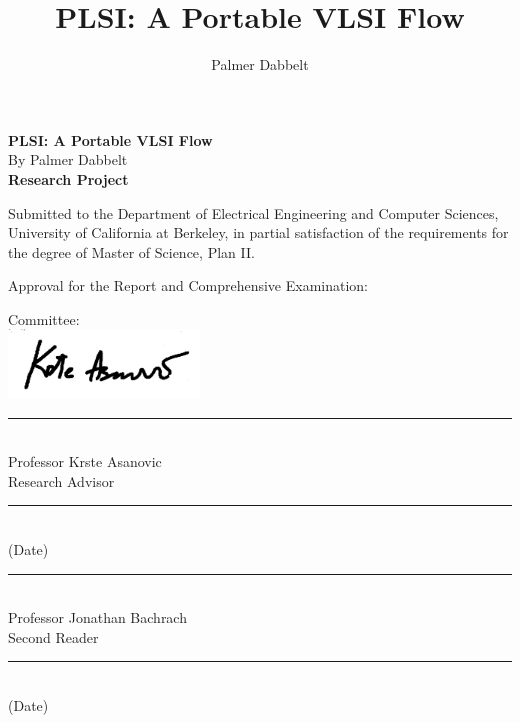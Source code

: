 \documentclass[masters2]{ucbthesis}
\author{Palmer Dabbelt}
\title{PLSI: A Portable VLSI Flow}
\begin{document}
\thispagestyle{empty}
\large
\begin{center}
\textbf{PLSI: A Portable VLSI Flow}\\
By Palmer Dabbelt\\
\textbf{Research Project}\\
\end{center}

\normalsize
Submitted to the Department of Electrical Engineering and Computer Sciences,
University of California at Berkeley, in partial satisfaction of the
requirements for the degree of Master of Science, Plan II.

Approval for the Report and Comprehensive Examination:

\begin{center}
Committee:\\
\includegraphics[width=2in]{figures/krste.png}
\rule{5in}{1pt}\\
Professor Krste Asanovic\\
Research Advisor\\
\vspace{0.5in}\rule{5in}{1pt}\\
(Date)\\
\vspace{0.5in}\rule{5in}{1pt}\\
Professor Jonathan Bachrach\\
Second Reader\\
\vspace{0.5in}\rule{5in}{1pt}\\
(Date)\\
\end{center}

\copyrightpage
\end{document}
